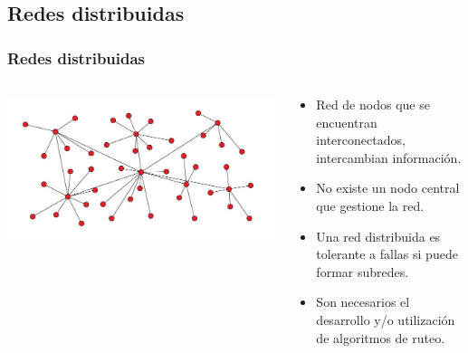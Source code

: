 \subsection{Redes distribuidas}
\begin{frame}
	\frametitle{Redes distribuidas}
	\begin{columns}[T]
		\begin{column}{.5\textwidth}
			\includegraphics[scale=0.25]{images/distribuida.png}
		\end{column}
		\begin{column}{.5\textwidth}
			\begin{itemize}
				\item Red de nodos que se encuentran interconectados, intercambian información. 
				\item No existe un nodo central que gestione la red. 
				\item Una red distribuida es tolerante a fallas si puede formar subredes.
				\item Son necesarios el desarrollo y/o utilización de algoritmos de ruteo.
			\end{itemize}
		\end{column}
	\end{columns}
\end{frame}

